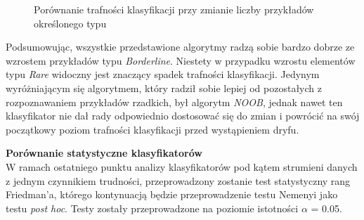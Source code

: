 \begin{figure}[h]
    \centering
    \qquad
    \caption{Porównanie trafności klasyfikacji przy zmianie liczby przykładów określonego typu}\label{Figure:BorderlineRare}
\end{figure}

\noindent Podsumowując, wszystkie przedstawione algorytmy radzą sobie bardzo dobrze ze wzrostem przykładów typu \textit{Borderline}. Niestety w przypadku wzrostu elementów typu \textit{Rare} widoczny jest znaczący spadek trafności klasyfikacji. Jedynym wyróżniającym się algorytmem, który radził sobie lepiej od pozostałych z rozpoznawaniem przykładów rzadkich, był algorytm \textit{NOOB}, jednak nawet ten klasyfikator nie dał rady odpowiednio dostosować się do zmian i powrócić na swój początkowy poziom trafności klasyfikacji przed wystąpieniem dryfu.

\noindent \textbf{Porównanie statystyczne klasyfikatorów}\\

\noindent W ramach ostatniego punktu analizy klasyfikatorów pod kątem strumieni danych z jednym czynnikiem trudności, przeprowadzony zostanie test statystyczny rang Friedman'a, którego kontynuacją będzie przeprowadzenie testu Nemenyi jako testu \textit{post hoc}. Testy zostały przeprowadzone na poziomie istotności $\alpha$ = 0.05.

